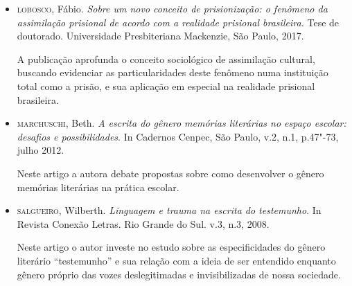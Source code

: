 \documentclass[11pt]{extarticle}
\begin{document}
\begin{itemize}
\item\textsc{lobosco}, Fábio. \textit{Sobre um novo conceito de prisionização: o fenômeno da
assimilação prisional de acordo com a realidade prisional brasileira.}
Tese de doutorado. Universidade Presbiteriana Mackenzie, São Paulo,
2017. 

A publicação aprofunda o conceito sociológico de assimilação
cultural, buscando evidenciar as particularidades deste fenômeno numa
instituição total como a prisão, e sua aplicação em especial na
realidade prisional brasileira.

\item\textsc{marchuschi}, Beth. \textit{A escrita do gênero memórias literárias no espaço
escolar: desafios e possibilidades}. In Cadernos Cenpec, São Paulo, v.2,
n.1, p.47"-73, julho 2012. 

Neste artigo a autora debate propostas sobre
como desenvolver o gênero memórias literárias na prática escolar.







\item\textsc{salgueiro}, Wilberth. \textit{Linguagem e trauma na escrita do testemunho}. In
Revista Conexão Letras. Rio Grande do Sul. v.3, n.3, 2008. 

Neste artigo o autor investe no estudo sobre as especificidades do gênero
literário ``testemunho'' e sua relação com a ideia de ser entendido
enquanto gênero próprio das vozes deslegitimadas e invisibilizadas de
nossa sociedade.


\end{itemize}
\end{document}
